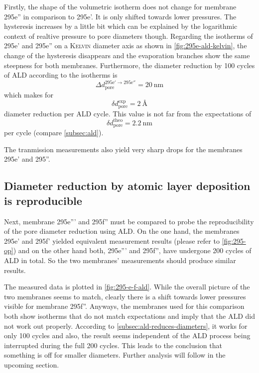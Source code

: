 \documentclass[../thesis.tex]{subfiles}
\begin{document}
      Firstly, the shape of the volumetric isotherm does not change for membrane 295e'' in comparison to 295e'. It is only shifted towards lower pressures. The hysteresis increases by a little bit which can be explained by the logarithmic context of realtive pressure to pore diameters though. Regarding the isotherms of 295e' and 295e'' on a \textsc{Kelvin} diameter axis as shown in \cref{fig:295e-ald-kelvin}, the change of the hysteresis disappears and the evaporation branches show the same steepness for both membranes. Furthermore, the diameter reduction by 100 cycles of ALD according to the isotherms is
      \begin{equation*}
        \Delta d_\mathrm{pore}^\mathrm{295e'\rightarrow 295e''}=\SI{20}{\nano\meter}
      \end{equation*}
      which makes for
      \begin{equation*}
        \delta d_\mathrm{pore}^\mathrm{exp} =\SI{2}{\angstrom}
      \end{equation*}
      diameter reduction per ALD cycle. This value is not far from the expectations of
      \begin{equation*}
        \delta d_\mathrm{pore}^\mathrm{theo} = \SI{2,2}{\nano\meter}
      \end{equation*}
      per cycle (compare \cref{subsec:ald}).

      The tranmission measurements also yield very sharp drops for the membranes 295e' and 295''.


    \subsection{Diameter reduction by atomic layer deposition is reproducible}
    \label{subsec:diameter-reduction-reproducible}

      Next, membrane 295e''' and 295f'' must be compared to probe the reproducibility of the pore diameter reduction using ALD. On the one hand, the membranes 295e' and 295f' yielded equivalent measurement results (please refer to \cref{fig:295-op}) and on the other hand both, 295e''' and 295f'', have undergone 200 cycles of ALD in total. So the two membranes' measurements should produce similar results.

      The measured data is plotted in \cref{fig:295-e-f-ald}. While the overall picture of the two membranes seems to match, clearly there is a shift towards lower pressures visible for membrane 295f''. Anyways, the membranes used for this comparison both show isotherms that do not match expectations and imply that the ALD did not work out properly. According to \cref{subsec:ald-reduces-diameters}, it works for only 100 cycles and also, the result seems independent of the ALD process being interrupted during the full 200 cycles. This leads to the conclusion that something is off for smaller diameters. Further analysis will follow in the upcoming section.
\end{document}
